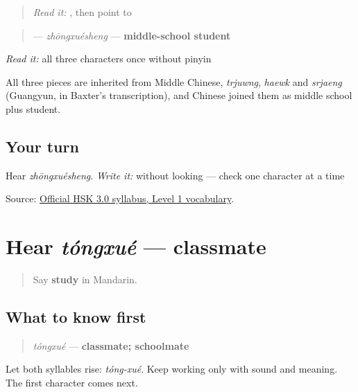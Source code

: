 \begin{quote}
\emph{Read it:} \textbf{}, then point to 
\end{quote}

\begin{cousinweb}
\begin{quote}
\textbf{} — \emph{zhōngxuésheng} — \textbf{middle-school student}
\end{quote}

\emph{Read it:} all three characters once without pinyin

All three pieces are inherited from Middle Chinese, \emph{trjuwng}, \emph{haewk} and \emph{srjaeng} (Guangyun, in Baxter's transcription), and Chinese joined them as middle school plus student.
\end{cousinweb}

\subsection*{Your turn}
Hear \emph{zhōngxuésheng}. \emph{Write it:} \textbf{} without looking — check one character at a time

\begin{tcolorbox}[breakable,colback=teal!4,colframe=teal!35!black,title={Before you move on}]
Source: \href{https://hsk.cn-bj.ufileos.com/3.0/\%E6\%96\%B0\%E7\%89\%88HSK\%E8\%80\%83\%E8\%AF\%95\%E5\%A4\%A7\%E7\%BA\%B21219.pdf}{Official HSK 3.0 syllabus, Level 1 vocabulary}.
\end{tcolorbox}
\section[tóngxué]{Hear \emph{tóngxué} — classmate}

\label{lesson:ZH-C15-hear-tongxue}



\begin{quote}
Say \textbf{study} in Mandarin.
\end{quote}

\subsection*{What to know first}
\begin{quote}
\emph{tóngxué} — \textbf{classmate; schoolmate}
\end{quote}

Let both syllables rise: \emph{tóng-xué}. Keep working only with sound and meaning. The first character comes next.

